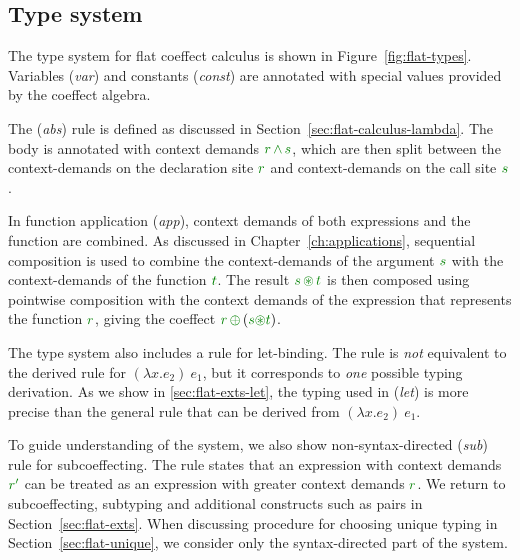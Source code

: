 
\subsection{Type system}
\label{sec:flat-calculus-types}

The type system for flat coeffect calculus is shown in Figure~\ref{fig:flat-types}. Variables
(\emph{var}) and constants (\emph{const}) are annotated with special values provided by the
coeffect algebra.

The (\emph{abs}) rule is defined as discussed in Section~\ref{sec:flat-calculus-lambda}. The
body is annotated with context demands $\cclrd{r} \,\czip\, \cclrd{s}$, which are then split
between the context-demands on the declaration site $\cclrd{r}$ and context-demands on
the call site $\cclrd{s}$.

In function application (\emph{app}), context demands of both expressions and the
function are combined. As discussed in Chapter~\ref{ch:applications}, sequential composition
is used to combine the context-demands of the argument $\cclrd{s}$ with the context-demands
of the function $\cclrd{t}$. The result $\cclrd{s}\,\cseq\,\cclrd{t}$ is then composed using
pointwise composition with the context demands of the expression that represents the function
$\cclrd{r}$, giving the coeffect $\cclrd{r}\,\cpar\,(\cclrd{s}\cseq\cclrd{t})$.

The type system also includes a rule for let-binding. The rule is \emph{not} equivalent to the
derived rule for $(\lambda x.e_2)~e_1$, but it corresponds to \emph{one} possible typing
derivation. As we show in \ref{sec:flat-exts-let}, the typing used in (\emph{let}) is more
precise than the general rule that can be derived from $(\lambda x.e_2)~e_1$.

To guide understanding of the system, we also show non-syntax-directed (\emph{sub}) rule for
subcoeffecting. The rule states that an expression with context demands $\cclrd{r'}$ can be
treated as an expression with greater context demands $\cclrd{r}$. We return to subcoeffecting,
subtyping and additional constructs such as pairs in Section~\ref{sec:flat-exts}. When
discussing procedure for choosing unique typing in Section~\ref{sec:flat-unique}, we consider
only the syntax-directed part of the system.


